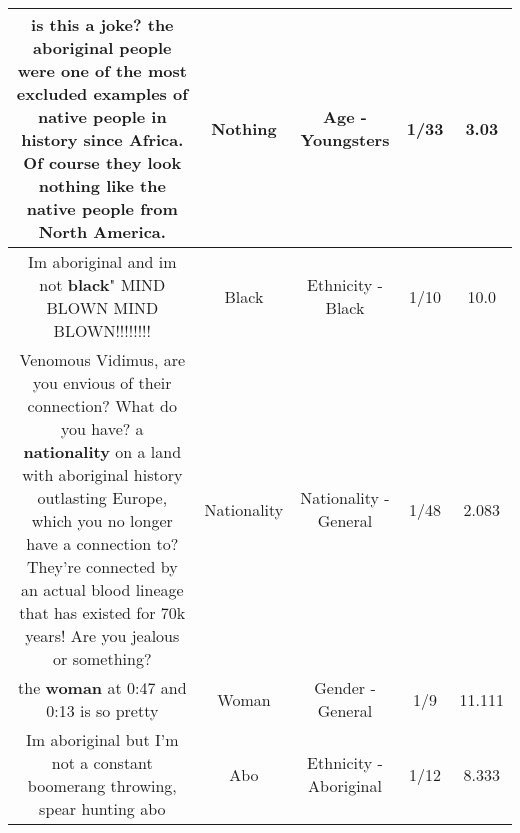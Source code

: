 \documentclass[11pt]{article}
\newlength\mylength
\begin{document}
\begin{center}
\begin{longtable}{|C{.65\mylength}|C{.30\mylength}|C{.12\mylength}|C{.12\mylength}|C{.12\mylength}|}
  \small is this a joke? the aboriginal people were one of the most excluded examples of native people in history since Africa. Of course they look \textbf{nothing} like the native people from North America.\normalsize   & Nothing & Age - Youngsters & 1/33 & 3.03 \\  \hline
  \small Im aboriginal and im not \textbf{black}" MIND BLOWN MIND BLOWN!!!!!!!!\normalsize   & Black & Ethnicity - Black & 1/10 & 10.0 \\  \hline
  \small Venomous Vidimus, are you envious of their connection? What do you have? a \textbf{nationality} on a land with aboriginal history outlasting Europe, which you no longer have a connection to? They're connected by an actual blood lineage that has existed for 70k years! Are you jealous or something?\normalsize   & Nationality & Nationality - General & 1/48 & 2.083 \\  \hline
  \small the \textbf{woman} at 0:47 and 0:13 is so pretty\normalsize   & Woman & Gender - General & 1/9 & 11.111 \\  \hline
  \small Im aboriginal but I'm not a constant boomerang throwing, spear hunting abo\normalsize   & Abo & Ethnicity - Aboriginal & 1/12 & 8.333 \\  \hline

\end{longtable}
\end{center}
\end{document}
